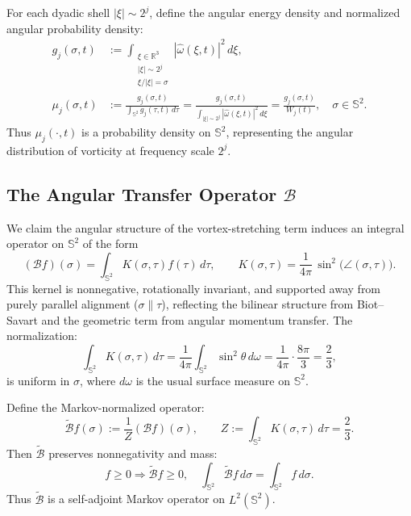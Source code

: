 \documentclass[11pt]{article}
\begin{document}
For each dyadic shell $|\xi| \sim 2^j$, define the angular energy density and normalized angular probability density:
\begin{align}
g_j(\sigma, t) &:= \int_{\substack{\xi \in \mathbb{R}^3 \\ |\xi| \sim 2^j \\ \xi/|\xi| = \sigma}} |\widehat{\omega}(\xi, t)|^2 \, d\xi, \tag{3.1} \\
\mu_j(\sigma, t) &:= \frac{g_j(\sigma, t)}{\int_{\mathbb{S}^2} g_j(\tau, t) \, d\tau} 
= \frac{g_j(\sigma, t)}{\int_{|\xi| \sim 2^j} |\widehat{\omega}(\xi, t)|^2 \, d\xi}
= \frac{g_j(\sigma, t)}{W_j(t)}, \quad \sigma \in \mathbb{S}^2. \tag{3.2}
\end{align}
Thus $\mu_j(\cdot, t)$ is a probability density on $\mathbb{S}^2$, representing the angular distribution of vorticity at frequency scale $2^j$.

\subsection{The Angular Transfer Operator $\mathcal{B}$}

We claim the angular structure of the vortex-stretching term induces an integral operator on $\mathbb{S}^2$ of the form
\begin{equation}
(\mathcal{B} f)(\sigma) = \int_{\mathbb{S}^2} K(\sigma, \tau) f(\tau) \, d\tau, 
\qquad K(\sigma, \tau) = \frac{1}{4\pi} \, \sin^2 \big( \angle(\sigma, \tau) \big). \tag{3.3}
\end{equation}
This kernel is nonnegative, rotationally invariant, and supported away from purely parallel alignment ($\sigma \parallel \tau$), reflecting the bilinear structure from Biot--Savart and the geometric term from angular momentum transfer. The normalization:
\[
\int_{\mathbb{S}^2} K(\sigma, \tau) \, d\tau = \frac{1}{4\pi} \int_{\mathbb{S}^2} \sin^2 \theta \, d\omega = \frac{1}{4\pi} \cdot \frac{8\pi}{3} = \frac{2}{3}, \tag{3.4}
\]
is uniform in $\sigma$, where $d\omega$ is the usual surface measure on $\mathbb{S}^2$. 

\medskip
Define the Markov-normalized operator:
\begin{equation}
\tilde{\mathcal{B}} f(\sigma) := \frac{1}{Z} (\mathcal{B} f)(\sigma), 
\qquad Z := \int_{\mathbb{S}^2} K(\sigma, \tau) \, d\tau = \frac{2}{3}. \tag{3.5}
\end{equation}
Then $\tilde{\mathcal{B}}$ preserves nonnegativity and mass:
\[
f \geq 0 \Rightarrow \tilde{\mathcal{B}} f \geq 0, \quad 
\int_{\mathbb{S}^2} \tilde{\mathcal{B}} f \, d\sigma = \int_{\mathbb{S}^2} f \, d\sigma. \tag{3.6}
\]
Thus $\tilde{\mathcal{B}}$ is a self-adjoint Markov operator on $L^2(\mathbb{S}^2)$.
\end{document}
